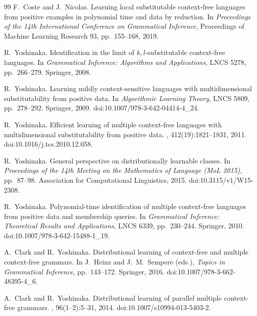 \documentclass[11pt]{article}
\numberwithin{equation}{section}
\theoremstyle{plain}
\theoremstyle{definition}
\theoremstyle{remark}
\begin{document}
\begin{thebibliography}{99}
F.~Coste and J.~Nicolas.
\newblock Learning local substitutable context-free languages from positive
examples in polynomial time and data by reduction.
\newblock In {\em Proceedings of the 14th International Conference on
Grammatical Inference}, Proceedings of Machine Learning Research 93,
pp.~155--168, 2019.

R.~Yoshinaka.
\newblock Identification in the limit of $k,l$-substitutable context-free
languages.
\newblock In {\em Grammatical Inference: Algorithms and Applications},
LNCS 5278, pp.~266--279. Springer, 2008.

R.~Yoshinaka.
\newblock Learning mildly context-sensitive languages with multidimensional
 substitutability from positive data.
\newblock In {\em Algorithmic Learning Theory}, LNCS 5809, pp.~278--292.
 Springer, 2009.
\newblock doi:10.1007/978-3-642-04414-4\_24.

R.~Yoshinaka.
\newblock Efficient learning of multiple context-free languages with
multidimensional substitutability from positive data.
, 412(19):1821--1831, 2011.
\newblock doi:10.1016/j.tcs.2010.12.058.

R.~Yoshinaka.
\newblock General perspective on distributionally learnable classes.
\newblock In \emph{Proceedings of the 14th Meeting on the Mathematics
of Language (MoL 2015)}, pp.~87--98.
Association for Computational Linguistics, 2015.
\newblock doi:10.3115/v1/W15-2308.

R.~Yoshinaka.
\newblock Polynomial-time identification of multiple context-free languages
from positive data and membership queries.
\newblock In {\em Grammatical Inference: Theoretical Results and Applications},
LNCS 6339, pp.~230--244. Springer, 2010.
\newblock doi:10.1007/978-3-642-15488-1\_19.

A.~Clark and R.~Yoshinaka.
\newblock Distributional learning of context-free and multiple context-free grammars.
\newblock In J.~Heinz and J.~M.~Sempere (eds.), \emph{Topics in Grammatical
Inference}, pp.~143--172. Springer, 2016.
\newblock doi:10.1007/978-3-662-48395-4\_6.

A.~Clark and R.~Yoshinaka.
\newblock Distributional learning of parallel multiple context-free grammars.
, 96(1--2):5--31, 2014.
\newblock doi:10.1007/s10994-013-5403-2.


\end{thebibliography}
\end{document}
